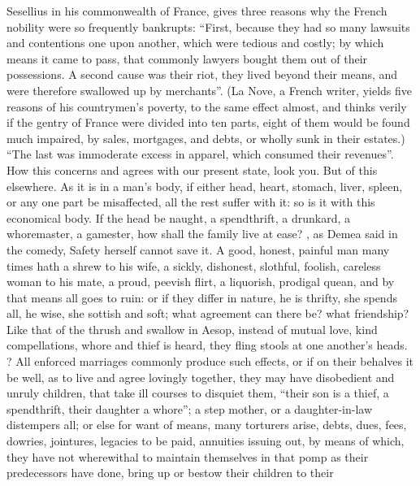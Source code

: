 Sesellius in his commonwealth of France, gives three
reasons why the French nobility were so frequently bankrupts: \enquote{First, because
they had so many lawsuits and contentions one upon another, which were tedious
and costly; by which means it came to pass, that commonly lawyers bought them
out of their possessions. A second cause was their riot, they lived beyond
their means, and were therefore swallowed up by merchants}. (La Nove, a French
writer, yields five reasons of his countrymen's poverty, to the same effect
almost, and thinks verily if the gentry of France were divided into ten parts,
eight of them would be found much impaired, by sales, mortgages, and debts, or
wholly sunk in their estates.) \enquote{The last was immoderate excess in apparel,
which consumed their revenues}. How this concerns and agrees with our present
state, look you. But of this elsewhere. As it is in a man's body, if either
head, heart, stomach, liver, spleen, or any one part be misaffected, all the
rest suffer with it: so is it with this economical body. If the head be naught,
a spendthrift, a drunkard, a whoremaster, a gamester, how shall the family live
at ease? , as Demea said in the comedy, Safety herself cannot save
it. A good, honest, painful man many times hath a shrew to his wife, a sickly,
dishonest, slothful, foolish, careless woman to his mate, a proud, peevish
flirt, a liquorish, prodigal quean, and by that means all goes to ruin: or if
they differ in nature, he is thrifty, she spends all, he wise, she sottish and
soft; what agreement can there be? what friendship? Like that of the thrush and
swallow in Aesop, instead of mutual love, kind compellations, whore and thief
is heard, they fling stools at one another's heads.
? All enforced
marriages commonly produce such effects, or if on their behalves it be well, as
to live and agree lovingly together, they may have disobedient and unruly
children, that take ill courses to disquiet them, \enquote{their
son is a thief, a spendthrift, their daughter a whore}; a step
mother, or a daughter-in-law distempers all;
or else for want of means, many torturers arise, debts,
dues, fees, dowries, jointures, legacies to be paid, annuities issuing out, by
means of which, they have not wherewithal to maintain themselves in that pomp
as their predecessors have done, bring up or bestow their children to their
